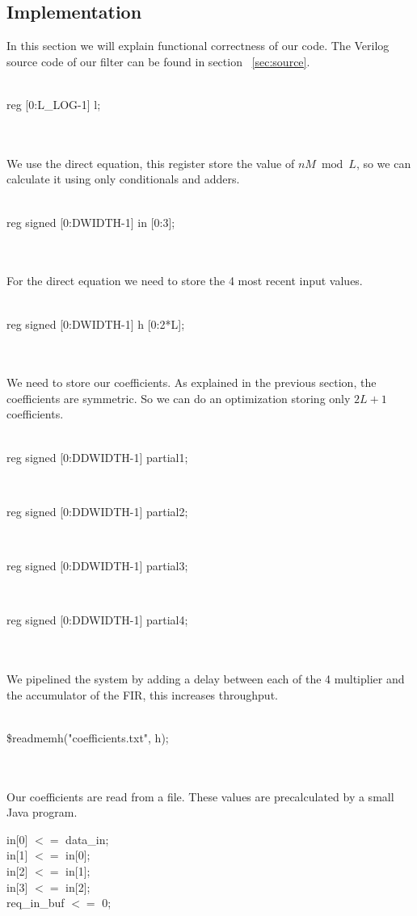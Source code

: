\subsection{Implementation}
In this section we will explain functional correctness of our code. The Verilog source code of our filter can be found in section ~\ref{sec:source}. \\
\\
\centerline{reg [0:L\_LOG-1] l;}\\
\\
We use the direct equation, this register store the value of $nM \bmod L$, so we can calculate it using only conditionals and adders.\\
\\
\centerline{reg signed [0:DWIDTH-1] in [0:3];}\\
\\
For the direct equation we need to store the 4 most recent input values.\\
\\
\centerline{reg signed [0:DWIDTH-1] h [0:2*L];}\\
\\
We need to store our coefficients. As explained in the previous section, the coefficients are symmetric. So we can do an optimization storing only $2L + 1$ coefficients.\\
\\
\centerline{reg signed [0:DDWIDTH-1] partial1;}\\
\centerline{reg signed [0:DDWIDTH-1] partial2;}\\
\centerline{reg signed [0:DDWIDTH-1] partial3;}\\
\centerline{reg signed [0:DDWIDTH-1] partial4;}\\
\\
We pipelined the system by adding a delay between each of the 4 multiplier and the accumulator of the FIR, this increases throughput.\\
\\
\centerline{\$readmemh("coefficients.txt", h);}\\
\\
Our coefficients are read from a file. These values are precalculated by a small Java program.\\
\begin{center}
\parbox{10cm}{
in[0] $<=$ data\_in;\\
in[1] $<=$ in[0];\\
in[2] $<=$ in[1];\\
in[3] $<=$ in[2];\\
req\_in\_buf $<=$ 0;\\
}
\end{center}
